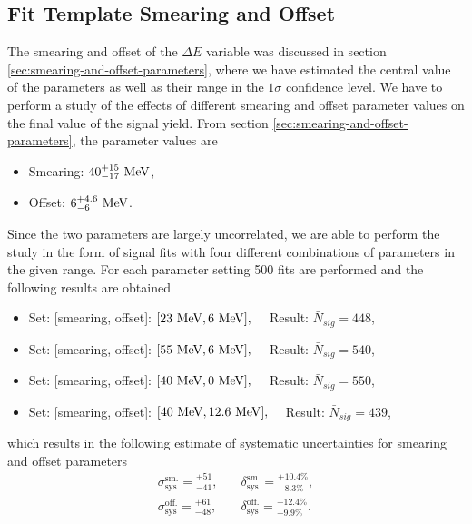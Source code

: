 \subsection{Fit Template Smearing and Offset}
The smearing and offset of the $\Delta E$ variable was discussed in section \ref{sec:smearing-and-offset-parameters}, where we have estimated the central value of the parameters as well as their range in the $1\sigma$ confidence level. We have to perform a study of the effects of different smearing and offset parameter values on the final value of the signal yield. From section \ref{sec:smearing-and-offset-parameters}, the parameter values are
\begin{itemize}
	\item Smearing: $40_{-17}^{+15}\mathrm{~MeV}$,
	\item Offset: $6_{-6}^{+4.6}\mathrm{~MeV}$.
\end{itemize}
Since the two parameters are largely uncorrelated, we are able to perform the study in the form of signal fits with four different combinations of parameters in the given range. For each parameter setting 500 fits are performed and the following results are obtained
\begin{itemize}
	\item Set: [smearing, offset]: $[23\mathrm{~MeV},6\mathrm{~MeV}],\quad$ Result: $ \bar N {}_{sig} = 448 $,
	\item Set: [smearing, offset]: $[55\mathrm{~MeV},6\mathrm{~MeV}],\quad$ Result: $ \bar N {}_{sig} = 540 $,
	\item Set: [smearing, offset]: $[40\mathrm{~MeV},0\mathrm{~MeV}],\quad$ Result: $ \bar N {}_{sig} = 550 $,
	\item Set: [smearing, offset]: $[40\mathrm{~MeV},12.6\mathrm{~MeV}],\quad$ Result: $ \bar N {}_{sig} = 439 $,
\end{itemize}
which results in the following estimate of systematic uncertainties for smearing and offset parameters
\begin{align}
\sigma_{\mathrm{sys}}^{\mathrm{sm.}} = {}^{+51}_{-41},&\quad \delta_{\mathrm{sys}}^{\mathrm{sm.}} = {}^{+10.4\%}_{-8.3\%}, \\
\sigma_{\mathrm{sys}}^{\mathrm{off.}} = {}^{+61}_{-48},&\quad \delta_{\mathrm{sys}}^{\mathrm{off.}} = {}^{+12.4\%}_{-9.9\%}.
\end{align}

